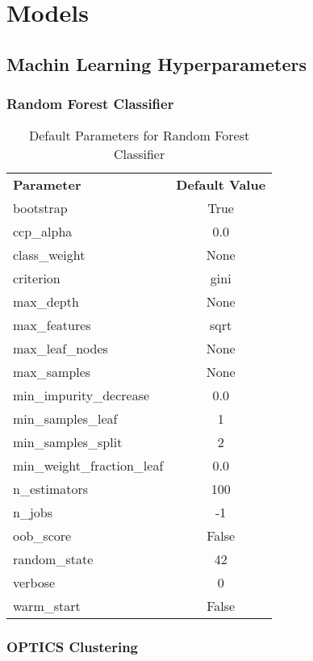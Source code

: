 \chapter{Models}
\section{Machin Learning Hyperparameters}
\subsection{Random Forest Classifier}

    \begin{table}[ht]
        \centering
        \caption{Default Parameters for Random Forest Classifier}
        \begin{tabular}{lc}
            \textbf{Parameter} & \textbf{Default Value} \\
            bootstrap & True \\
            ccp\_alpha & 0.0 \\
            class\_weight & None \\
            criterion & gini \\
            max\_depth & None \\
            max\_features & sqrt \\
            max\_leaf\_nodes & None \\
            max\_samples & None \\
            min\_impurity\_decrease & 0.0 \\
            min\_samples\_leaf & 1 \\
            min\_samples\_split & 2 \\
            min\_weight\_fraction\_leaf & 0.0 \\
            n\_estimators & 100 \\
            n\_jobs & -1 \\
            oob\_score & False \\
            random\_state & 42 \\
            verbose & 0 \\
            warm\_start & False \\
        \end{tabular}
    \end{table}

    \subsection{OPTICS Clustering}

